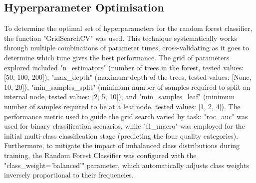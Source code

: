 \subsection{Hyperparameter Optimisation}
\label{ssec:hyperparameter_optimisation} %
To determine the optimal set of hyperparameters for the random forest classifier, the function "GridSearchCV" was used. This technique systematically works through multiple combinations of parameter tunes, cross-validating as it goes to determine which tune gives the best performance. The grid of parameters explored included "n\_estimators" (number of trees in the forest, tested values: [50, 100, 200]), "max\_depth" (maximum depth of the trees, tested values: [None, 10, 20]), "min\_samples\_split" (minimum number of samples required to split an internal node, tested values: [2, 5, 10]), and "min\_samples\_leaf" (minimum number of samples required to be at a leaf node, tested values: [1, 2, 4]).
The performance metric used to guide the grid search varied by task: "roc\_auc" was used for binary classification scenarios, while "f1\_macro" was employed for the initial multi-class classification stage (predicting the four quality categories). Furthermore, to mitigate the impact of imbalanced class distributions during training, the Random Forest Classifier was configured with the "class\_weight='balanced'" parameter, which automatically adjusts class weights inversely proportional to their frequencies.


